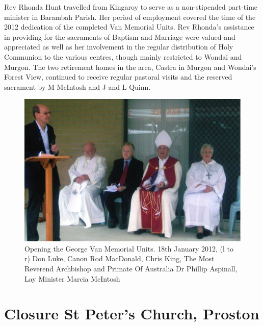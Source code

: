 Rev Rhonda Hunt travelled from Kingaroy to serve as a non-stipended part-time minister in Barambah Parish. Her period of employment covered the time of the 2012 dedication of the completed Van Memorial Units. Rev Rhonda's assistance in providing for the sacraments of Baptism and Marriage were valued and appreciated as well as her involvement in the regular distribution of Holy Communion to the various centres, though mainly restricted to Wondai and Murgon. The two retirement homes in the area, Castra in Murgon and Wondai's Forest View, continued to receive regular pastoral visits and the reserved sacrament by M McIntosh and J and L Quinn.









\begin{figure}[!htb]
\begin{center}
\includegraphics[width=1.\textwidth,center]{../images/openingGeorgeVannMemorialUnits.jpg}
\caption{Opening the George Van Memorial Units. 18th January 2012, (l to r) Don Luke, Canon Rod MacDonald, Chris King, The Most Reverend Archbishop and Primate Of Australia Dr Phillip Aspinall, Lay Minister Marcia McIntosh}
\end{center}
\end{figure}




\section{Closure St Peter's Church, Proston}



